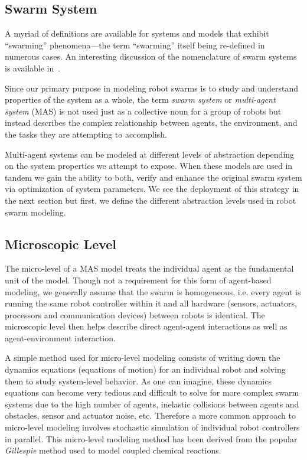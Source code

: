 \documentclass[Main.tex]{subfiles}
\begin{document}
\subsection{Swarm System}
A myriad of definitions are available for systems and models that exhibit ``swarming'' phenomena---the term ``swarming'' itself being re-defined in numerous cases. An interesting discussion of the nomenclature of swarm systems is available in~\cite{Beni2005,Beni2005a}.

Since our primary purpose in modeling robot swarms is to study and understand properties of the system as a whole, the term \emph{swarm system} or \emph{multi-agent system} (MAS) is not used just as a collective noun for a group of robots but instead describes the complex relationship between agents, the environment, and the tasks they are attempting to accomplish.

Multi-agent systems can be modeled at different levels of abstraction depending on the system properties we attempt to expose. When these models are used in tandem we gain the ability to both, verify and enhance the original swarm system via optimization of system parameters. We see the deployment of this strategy in the next section but first, we define the different abstraction levels used in robot swarm modeling.


\subsection{Microscopic Level}
The micro-level of a MAS model treats the individual agent as the fundamental unit of the model\cite{Lerman2001a}. Though not a requirement for this form of agent-based modeling, we generally assume that the swarm is homogeneous, i.e. every agent is running the same robot controller within it and all hardware (sensors, actuators, processors and communication devices) between robots is identical. The microscopic level then helps describe direct agent-agent interactions as well as agent-environment interaction. 

A simple method used for micro-level modeling consists of writing down the dynamics equations (equations of motion) for an individual robot and solving them to study system-level behavior. As one can imagine, these dynamics equations can become very tedious and difficult to solve for more complex swarm systems due to the high number of agents, inelastic collisions between agents and obstacles, sensor and actuator noise, etc. Therefore a more common approach to micro-level modeling involves stochastic simulation of individual robot controllers in parallel. This micro-level modeling method has been derived from the popular \emph{Gillespie} method\cite{Gillespie1976,Gillespie1977} used to model coupled chemical reactions.
\end{document}
